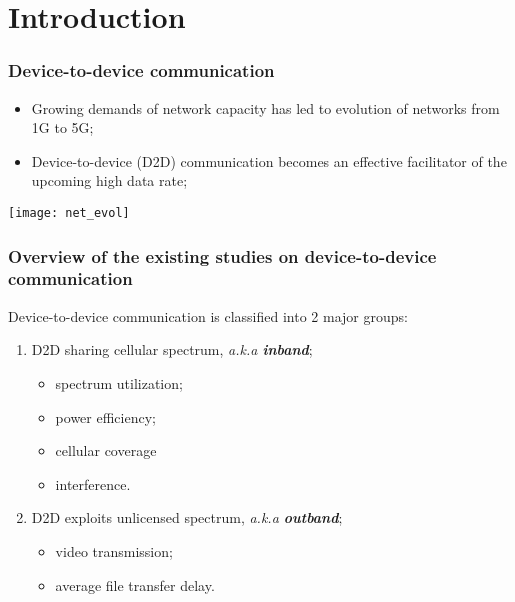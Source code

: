 \section {Introduction}

\begin {frame}
  \frametitle {Device-to-device communication}
  \begin{minipage}{0.45\textwidth}
	\begin{itemize}
	  \item Growing demands of network capacity has led to evolution of networks from 1G to 5G;
	  \item Device-to-device (D2D) communication becomes an effective facilitator of the upcoming high data rate; 
	\end{itemize}
  \end{minipage}
  \begin{minipage}{0.4\textwidth}
    \texttt{[image: net\_evol]}
  \end{minipage}
\end {frame}

\begin {frame}
  \frametitle {Overview of the existing studies on device-to-device communication}
  Device-to-device communication is classified into 2 major groups:
  \begin {enumerate}
    \item D2D sharing cellular spectrum, {\it a.k.a {\bf inband}};
    \begin{itemize}
      \item spectrum utilization;
      \item power efficiency;
      \item cellular coverage
    \end{itemize}
    \begin{itemize}
      \item interference.
    \end{itemize}
    \item D2D exploits unlicensed spectrum, {\it a.k.a {\bf outband}};
    \begin{itemize}
      \item video transmission;
      \item average file transfer delay.
    \end{itemize}
  \end{enumerate}
\end {frame}
